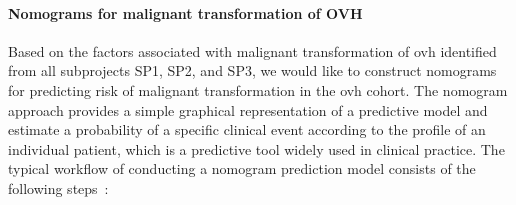 \documentclass[12pt, a4paper]{article}
\begin{document}










\paragraph{Nomograms for malignant transformation of OVH}


Based on the factors associated with malignant transformation of \acrshort{ovh} identified from all subprojects SP1, SP2, and SP3, we would like to construct nomograms for predicting risk of malignant transformation in the \acrshort{ovh} cohort. The nomogram approach provides a simple graphical representation of a predictive model and estimate a probability of a specific clinical event according to the profile of an individual patient, which is a predictive tool widely used in clinical practice. 
The typical workflow of conducting a nomogram prediction model consists of the following steps~\citep{Iasonos2008}:
\end{document}
